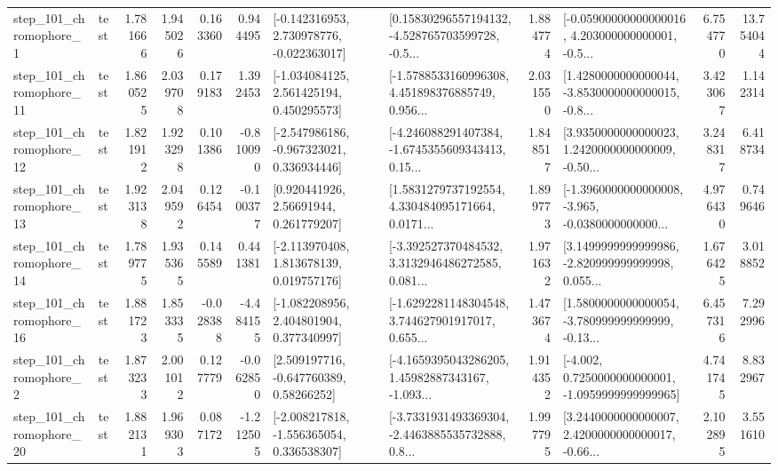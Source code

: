 \begin{tabular}{llrrrrllrlrr}
   step\_101\_chromophore\_1 &      test &      1.781666 &    1.945026 &      0.163360 &  0.944495 &   [-0.142316953, 2.730978776, -0.022363017] &  [0.15830296557194132, -4.528765703599728, -0.5... &       1.884774 &  [-0.05900000000000016, 4.203000000000001, -0.5... &            6.754770 &         13.754044 \\
  step\_101\_chromophore\_11 &      test &      1.860525 &    2.039708 &      0.179183 &  1.392453 &    [-1.034084125, 2.561425194, 0.450295573] &  [-1.5788533160996308, 4.451898376885749, 0.956... &       2.031550 &  [1.4280000000000044, -3.8530000000000015, -0.8... &            3.423067 &          1.142314 \\
  step\_101\_chromophore\_12 &      test &      1.821912 &    1.923298 &      0.101386 & -0.810090 &   [-2.547986186, -0.967323021, 0.336934446] &  [-4.246088291407384, -1.6745355609343413, 0.15... &       1.848517 &  [3.9350000000000023, 1.2420000000000009, -0.50... &            3.248317 &          6.418734 \\
  step\_101\_chromophore\_13 &      test &      1.923138 &    2.049592 &      0.126454 & -0.100377 &      [0.920441926, 2.56691944, 0.261779207] &  [1.5831279737192554, 4.330484095171664, 0.0171... &       1.899773 &  [-1.3960000000000008, -3.965, -0.0380000000000... &            4.976430 &          0.749646 \\
  step\_101\_chromophore\_14 &      test &      1.789775 &    1.935365 &      0.145589 &  0.441381 &    [-2.113970408, 1.813678139, 0.019757176] &  [-3.392527370484532, 3.3132946486272585, 0.081... &       1.971632 &  [3.1499999999999986, -2.820999999999998, 0.055... &            1.676425 &          3.018852 \\
  step\_101\_chromophore\_16 &      test &      1.881723 &    1.853335 &     -0.028388 & -4.484155 &    [-1.082208956, 2.404801904, 0.377340997] &  [-1.6292281148304548, 3.744627901917017, 0.655... &       1.473674 &  [1.5800000000000054, -3.780999999999999, -0.13... &            6.457316 &          7.292996 \\
   step\_101\_chromophore\_2 &      test &      1.873233 &    2.001012 &      0.127779 & -0.062850 &     [2.509197716, -0.647760389, 0.58266252] &  [-4.1659395043286205, 1.45982887343167, -1.093... &       1.914352 &  [-4.002, 0.7250000000000001, -1.0959999999999965] &            4.741745 &          8.832967 \\
  step\_101\_chromophore\_20 &      test &      1.882131 &    1.969303 &      0.087172 & -1.212505 &   [-2.008217818, -1.556365054, 0.336538307] &  [-3.7331931493369304, -2.4463885535732888, 0.8... &       1.997795 &  [3.2440000000000007, 2.4200000000000017, -0.66... &            2.102895 &          3.551610 \\

\end{tabular}
